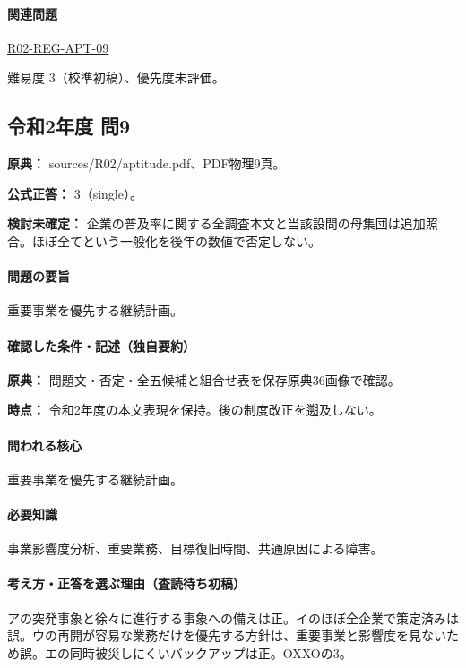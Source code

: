 \paragraph{関連問題} \hyperref[q:r02-reg-apt-09]{R02-REG-APT-09}

\par 難易度 3（校準初稿）、優先度未評価。

\subsection{令和2年度 問9}
\label{q:r02-reg-apt-09}

\noindent\textbf{原典：} sources/R02/aptitude.pdf、PDF物理9頁。

\textbf{公式正答：} 3（single）。

\par\textbf{検討未確定：} 企業の普及率に関する全調査本文と当該設問の母集団は追加照合。ほぼ全てという一般化を後年の数値で否定しない。

\paragraph{問題の要旨} 重要事業を優先する継続計画。

\paragraph{確認した条件・記述（独自要約）}\mbox{}\par

\noindent\textbf{原典：} 問題文・否定・全五候補と組合せ表を保存原典36画像で確認。\par

\noindent\textbf{時点：} 令和2年度の本文表現を保持。後の制度改正を遡及しない。\par

\paragraph{問われる核心} 重要事業を優先する継続計画。

\paragraph{必要知識} 事業影響度分析、重要業務、目標復旧時間、共通原因による障害。

\paragraph{考え方・正答を選ぶ理由（査読待ち初稿）} アの突発事象と徐々に進行する事象への備えは正。イのほぼ全企業で策定済みは誤。ウの再開が容易な業務だけを優先する方針は、重要事業と影響度を見ないため誤。エの同時被災しにくいバックアップは正。OXXOの3。

